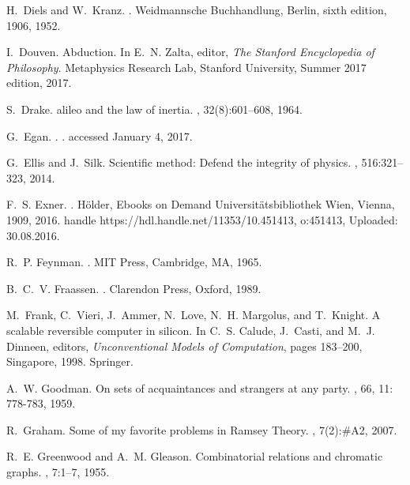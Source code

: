 \documentclass[12pt]{article}
\begin{document}
\begin{thebibliography}{10}
H.~Diels and W.~Kranz.
.
\newblock Weidmannsche Buchhandlung, Berlin, sixth edition, 1906, 1952.

I.~Douven.
\newblock Abduction.
\newblock In E.~N. Zalta, editor, {\em The Stanford Encyclopedia of
  Philosophy}. Metaphysics Research Lab, Stanford University, Summer 2017
  edition, 2017.

S.~Drake.
alileo and the law of inertia.
, 32(8):601--608, 1964.

G.~Egan.
.
.
\newblock accessed January 4, 2017.

G.~Ellis and J.~Silk.
\newblock Scientific method: Defend the integrity of physics.
, 516:321--323, 2014.

F.~S. Exner.
.
\newblock H\"older, Ebooks on Demand Universit\"{a}tsbibliothek Wien, Vienna,
  1909, 2016.
\newblock handle https://hdl.handle.net/11353/10.451413, o:451413, Uploaded:
  30.08.2016.

R.~P. Feynman.
.
\newblock MIT Press, Cambridge, MA, 1965.

B.~C.~V. Fraassen.
.
\newblock Clarendon Press, Oxford, 1989.

M.~Frank, C.~Vieri, J.~Ammer, N.~Love, N.~H. Margolus, and T.~Knight.
\newblock A scalable reversible computer in silicon.
\newblock In C.~S. Calude, J.~Casti, and M.~J. Dinneen, editors, {\em
  Unconventional Models of Computation}, pages 183--200, Singapore, 1998.
  Springer.

A.~W. Goodman.
\newblock On sets of acquaintances and strangers at any party.
, 66, 11: 778-783, 1959.

R.~Graham.
\newblock Some of my favorite problems in {R}amsey {T}heory.
, 7(2):\#A2, 2007.

R.~E. Greenwood and A.~M. Gleason.
\newblock Combinatorial relations and chromatic graphs.
, 7:1--7, 1955.


\end{thebibliography}
\end{document}
